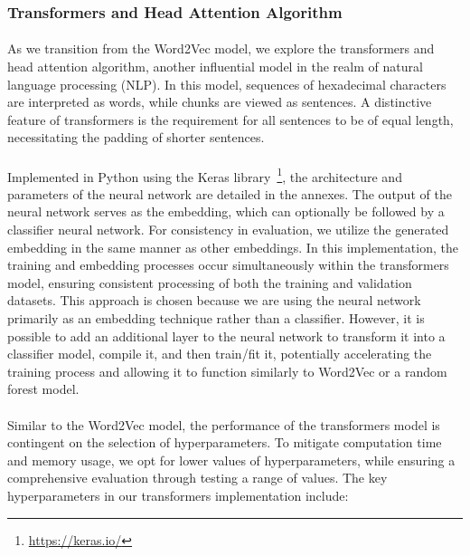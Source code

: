     \subsubsection{Transformers and Head Attention Algorithm}
        \paragraph{}As we transition from the Word2Vec model, we explore the transformers and head attention algorithm, another influential model in the realm of natural language processing (NLP). In this model, sequences of hexadecimal characters are interpreted as words, while chunks are viewed as sentences. A distinctive feature of transformers is the requirement for all sentences to be of equal length, necessitating the padding of shorter sentences.
        
        \paragraph{}Implemented in Python using the Keras library~\footnote{\url{https://keras.io/}}, the architecture and parameters of the neural network are detailed in the annexes. The output of the neural network serves as the embedding, which can optionally be followed by a classifier neural network. For consistency in evaluation, we utilize the generated embedding in the same manner as other embeddings. In this implementation, the training and embedding processes occur simultaneously within the transformers model, ensuring consistent processing of both the training and validation datasets. This approach is chosen because we are using the neural network primarily as an embedding technique rather than a classifier. However, it is possible to add an additional layer to the neural network to transform it into a classifier model, compile it, and then train/fit it, potentially accelerating the training process and allowing it to function similarly to Word2Vec or a random forest model.

        \paragraph{}Similar to the Word2Vec model, the performance of the transformers model is contingent on the selection of hyperparameters. To mitigate computation time and memory usage, we opt for lower values of hyperparameters, while ensuring a comprehensive evaluation through testing a range of values. The key hyperparameters in our transformers implementation include:
        
